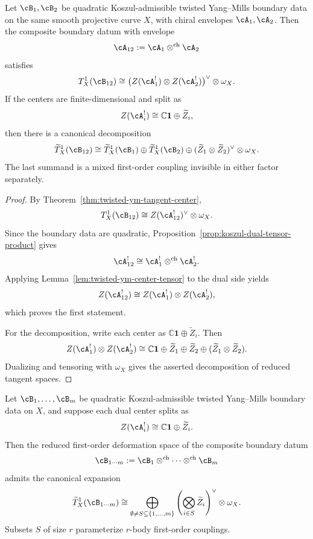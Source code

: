\begin{theorem}
\label{thm:twisted-ym-binary-mixed-couplings}
Let $\cB_1,\cB_2$ be quadratic Koszul-admissible twisted Yang--Mills boundary data on the same smooth projective curve $X$, with chiral envelopes $\cA_1,\cA_2$. Then the composite boundary datum with envelope
\[
\cA_{12}:=\cA_1\otimes^{\mathrm{ch}}\cA_2
\]
satisfies
\[
T^1_X(\cB_{12})
\cong
\bigl(Z(\cA_1^{!})\otimes Z(\cA_2^{!})\bigr)^{\vee}\otimes \omega_X.
\]
If the centers are finite-dimensional and split as
\[
Z(\cA_i^{!}) \cong \mathbb{C}\mathbf{1}\oplus \widetilde Z_i,
\]
then there is a canonical decomposition
\[
\widetilde T^1_X(\cB_{12})
\cong
\widetilde T^1_X(\cB_1)
\oplus
\widetilde T^1_X(\cB_2)
\oplus
(\widetilde Z_1\otimes \widetilde Z_2)^{\vee}\otimes \omega_X.
\]
The last summand is a mixed first-order coupling invisible in either factor separately.
\end{theorem}

\begin{proof}
By Theorem~\ref{thm:twisted-ym-tangent-center},
\[
T^1_X(\cB_{12})
\cong
Z(\cA_{12}^{!})^{\vee}\otimes \omega_X.
\]
Since the boundary data are quadratic, Proposition~\ref{prop:koszul-dual-tensor-product} gives
\[
\cA_{12}^{!}
\cong
\cA_1^{!}\otimes^{\mathrm{ch}}\cA_2^{!}.
\]
Applying Lemma~\ref{lem:twisted-ym-center-tensor} to the dual side yields
\[
Z(\cA_{12}^{!})
\cong
Z(\cA_1^{!})\otimes Z(\cA_2^{!}),
\]
which proves the first statement.

For the decomposition, write each center as $\mathbb{C}\mathbf{1}\oplus \widetilde Z_i$. Then
\[
Z(\cA_1^{!})\otimes Z(\cA_2^{!})
\cong
\mathbb{C}\mathbf{1}
\oplus
\widetilde Z_1
\oplus
\widetilde Z_2
\oplus
(\widetilde Z_1\otimes \widetilde Z_2).
\]
Dualizing and tensoring with $\omega_X$ gives the asserted decomposition of reduced tangent spaces.
\end{proof}

\begin{corollary}
\label{cor:twisted-ym-multibody-couplings}
Let $\cB_1,\dots,\cB_m$ be quadratic Koszul-admissible twisted Yang--Mills boundary data on $X$, and suppose each dual center splits as
\[
Z(\cA_i^{!}) \cong \mathbb{C}\mathbf{1}\oplus \widetilde Z_i.
\]
Then the reduced first-order deformation space of the composite boundary datum
\[
\cB_{1\cdots m}
:=
\cB_1\otimes^{\mathrm{ch}}\cdots\otimes^{\mathrm{ch}}\cB_m
\]
admits the canonical expansion
\[
\widetilde T^1_X(\cB_{1\cdots m})
\cong
\bigoplus_{\emptyset \neq S \subseteq \{1,\dots,m\}}
\left(\bigotimes_{i\in S} \widetilde Z_i\right)^{\vee}\otimes \omega_X.
\]
Subsets $S$ of size $r$ parameterize $r$-body first-order couplings.
\end{corollary}

